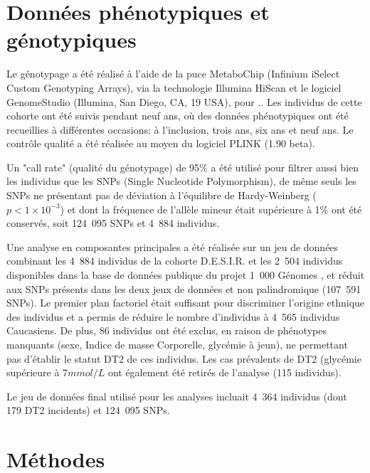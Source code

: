 \documentclass[11pt, a4paper]{article}
\begin{document}
\section{Données phénotypiques et génotypiques\label{sec:Materiels}}
\par{Le génotypage a été réalisé à l'aide de la puce MetaboChip (Infinium iSelect Custom Genotyping Arrays)\citep{voight_metabochip_2012},
via la technologie Illumina HiScan et le logiciel GenomeStudio (Illumina, San Diego, CA, 19 USA),
pour ..
Les individus de cette cohorte ont été suivis pendant neuf ans, où des données phénotypiques ont été recueillies à différentes occasions: à l'inclusion, trois ans, six ans et neuf ans.
Le contrôle qualité a été réalisée au moyen du logiciel PLINK (1.90 beta)\citep{chang_second-generation_2015, purcell_plink_2015}.}
\par{Un "call rate" (qualité du génotypage) de 95\% a été utilisé pour filtrer aussi bien les individus que les SNPs (Single Nucleotide Polymorphism),
de même seuls les SNPs ne présentant pas de déviation à l'équilibre de Hardy-Weinberg ($p<1 \times 10^{-3}$) et dont la fréquence de l'allèle mineur
était supérieure à 1\% ont été conservés, soit 124~095 SNPs et 4~884 individus.}
\par{Une analyse en composantes principales a été réalisée sur un jeu de données combinant les 4~884 individus de la cohorte D.E.S.I.R.
et les 2~504 individus disponibles dans la base de données publique du projet 1~000 Génomes \citep{the_1000_genomes_project_consortium_global_2015},
et réduit aux SNPs présents dans les deux jeux de données et non palindromique (107~591 SNPs).
Le premier plan factoriel était suffisant pour discriminer l'origine ethnique des individus et a permis de réduire le nombre d'individus à 4~565 individus Caucasiens.
De plus, 86 individus ont été exclus, en raison de phénotypes manquants (sexe, Indice de masse Corporelle, glycémie à jeun), ne permettant pas d'établir le statut DT2 de ces individus.
Les cas prévalents de DT2 (glycémie supérieure à $7mmol/L$ ont également été retirés de l'analyse (115 individus).}
\par{Le jeu de données final utilisé pour les analyses incluait 4~364 individus (dont 179 DT2 incidents) et 124~095 SNPs.}


\clearpage
\section{Méthodes\label{sec:Methods}}
\end{document}
